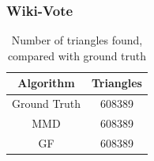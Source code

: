 \documentclass[a4paper,11pt, twoside]{article}
\begin{document}
            \subsubsection{Wiki-Vote}
            \begin{table}[h!]
                    \centering
            	\small
            	\begin{tabular}{cc}
            		\toprule
            		\textbf{Algorithm}  & \textbf{Triangles} \\
            		\midrule
            		Ground Truth   & 608389  \\
            		MMD            & 608389  \\
            		GF    & 608389  \\
            		\bottomrule
            	\end{tabular}
                    \label{tab:triangles}
                    \caption{Number of triangles found, compared with ground truth}
            \end{table}
    
\end{document}
